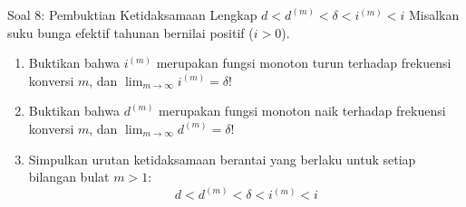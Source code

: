 \documentclass[11pt,a4paper]{article}
\begin{document}
\vspace{1.2em}

\begin{problembox}{Soal 8: Pembuktian Ketidaksamaan Lengkap $d < d^{(m)} < \delta < i^{(m)} < i$}
Misalkan suku bunga efektif tahunan bernilai positif ($i > 0$).
\begin{enumerate}[label=(\alph*)]
    \item Buktikan bahwa $i^{(m)}$ merupakan fungsi monoton turun terhadap frekuensi konversi $m$, dan $\lim_{m \to \infty} i^{(m)} = \delta$!
    \item Buktikan bahwa $d^{(m)}$ merupakan fungsi monoton naik terhadap frekuensi konversi $m$, dan $\lim_{m \to \infty} d^{(m)} = \delta$!
    \item Simpulkan urutan ketidaksamaan berantai yang berlaku untuk setiap bilangan bulat $m > 1$:
    \begin{equation*}
        d < d^{(m)} < \delta < i^{(m)} < i
    \end{equation*}
\end{enumerate}
\end{problembox}
\end{document}
